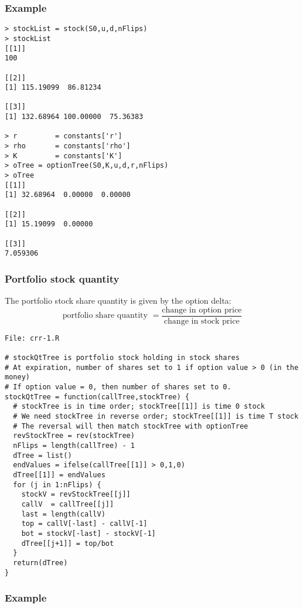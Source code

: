 \documentclass[10pt]{article}
\begin{document}
\subsubsection*{Example}

\begin{verbatim}
> stockList = stock(S0,u,d,nFlips)
> stockList
[[1]]
100

[[2]]
[1] 115.19099  86.81234

[[3]]
[1] 132.68964 100.00000  75.36383

> r         = constants['r']
> rho       = constants['rho']
> K         = constants['K']
> oTree = optionTree(S0,K,u,d,r,nFlips)
> oTree
[[1]]
[1] 32.68964  0.00000  0.00000

[[2]]
[1] 15.19099  0.00000

[[3]]
7.059306
\end{verbatim}

\subsubsection*{Portfolio stock quantity}

The portfolio stock share quantity is given by the option delta:
\[
\text{portfolio share quantity } = \frac{\text{change in option price}}{\text{change in stock price}}
\]

\begin{verbatim}
File: crr-1.R

# stockQtTree is portfolio stock holding in stock shares
# At expiration, number of shares set to 1 if option value > 0 (in the money)
# If option value = 0, then number of shares set to 0.
stockQtTree = function(callTree,stockTree) {
  # stockTree is in time order; stockTree[[1]] is time 0 stock
  # We need stockTree in reverse order; stockTree[[1]] is time T stock
  # The reversal will then match stockTree with optionTree
  revStockTree = rev(stockTree)
  nFlips = length(callTree) - 1
  dTree = list()
  endValues = ifelse(callTree[[1]] > 0,1,0)
  dTree[[1]] = endValues
  for (j in 1:nFlips) {
    stockV = revStockTree[[j]]
    callV  = callTree[[j]]
    last = length(callV)
    top = callV[-last] - callV[-1]
    bot = stockV[-last] - stockV[-1]
    dTree[[j+1]] = top/bot
  }
  return(dTree)
}
\end{verbatim}

\subsubsection*{Example}
\end{document}

